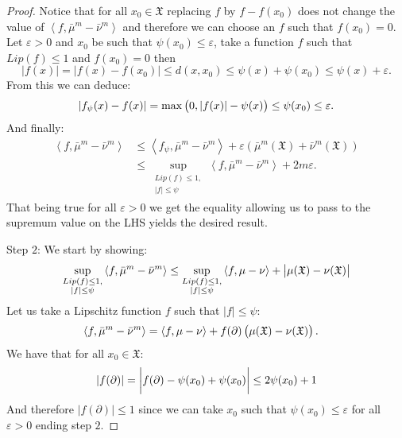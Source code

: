 \documentclass[11pt,a4paper]{article}
\newcommand{\XF}{\mathfrak{X}}
\newcommand{\brac}[1]{\left\langle#1\right\rangle}
\begin{document}
\begin{proof}
    Notice that for all $x_0 \in \XF$ replacing $f$ by $f - f(x_0)$ does not change the value of $\brac{f,\bar{\mu}^m - \bar{\nu}^m}$ and therefore we can choose an $f$ such that $f(x_0) = 0$. Let $\varepsilon > 0$ and $x_0$ be such that $\psi(x_0) \leq \varepsilon$, take a function $f$ such that $Lip(f) \leq 1$ and $f(x_0) = 0$ then 
    \[
    |f(x)| = |f(x) - f(x_0)| \leq d(x,x_0) \leq \psi(x) + \psi(x_0) \leq \psi(x) + \varepsilon.
    \]
    From this we can deduce:
    \[
    |f_\psi(x) - f(x)| = \max\left(0,|f(x)| - \psi(x) \vphantom{A^2}\right) \leq \psi(x_0) \leq \varepsilon.
    \]
    And finally:
    \begin{align*}
        \brac{f,\bar{\mu}^m - \bar{\nu}^m} &\leq \brac{f_\psi,\bar{\mu}^m - \bar{\nu}^m} + \varepsilon\left(\bar{\mu}^m(\XF) + \bar{\nu}^m(\XF)\right)\\
        &\leq \sup\limits_{\substack{Lip(f) \leq 1,\\ |f| \leq \psi}} \brac{f,\bar{\mu}^m - \bar{\nu}^m} + 2m\varepsilon .
    \end{align*}
    That being true for all $\varepsilon > 0$ we get the equality allowing us to pass to the supremum value on the LHS yields the desired result.

    Step $2$: We start by showing:
    \begin{align*}
        \sup\limits_{\substack{Lip(f) \leq 1,\\ |f| \leq \psi}} \brac{f,\bar{\mu}^m - \bar{\nu}^m} \leq \sup\limits_{\substack{Lip(f) \leq 1,\\ |f| \leq \psi}} \brac{f,\mu - \nu} + \left|\vphantom{A^2}\mu(\XF) - \nu(\XF) \right|
    \end{align*}
    Let us take a Lipschitz function $f$ such that $|f| \leq \psi$:
    \begin{align*}
        \brac{f,\bar{\mu}^m - \bar{\nu}^m} &= \brac{f,\mu - \nu} + f(\partial) \left(\mu(\XF) - \nu(\XF)\vphantom{A^2}\right).
    \end{align*}
    We have that for all $x_0 \in \XF$:
    \[
    |f(\partial)| = \left|\vphantom{A^{\int_0}}f(\partial) - \psi(x_0) + \psi(x_0)\right| \leq 2\psi(x_0) + 1
    \]
    And therefore $|f(\partial)| \leq 1$ since we can take $x_0$ such that $\psi(x_0) \leq \varepsilon$ for all $\varepsilon > 0$ ending step $2$.
    

\end{proof}
\end{document}
